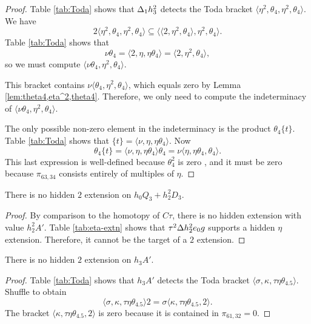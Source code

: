 \begin{proof}
Table \ref{tab:Toda} shows that $\Delta_1 h_3^2$ detects the
Toda bracket $\langle \eta^2, \theta_4, \eta^2, \theta_4 \rangle$.
We have
\[
2 \langle \eta^2, \theta_4, \eta^2, \theta_4 \rangle \subseteq
\langle \langle 2, \eta^2, \theta_4 \rangle, \eta^2, \theta_4 \rangle.
\]
Table \ref{tab:Toda} shows that
\[
\nu \theta_4 = \langle 2, \eta, \eta \theta_4 \rangle =
\langle 2, \eta^2, \theta_4 \rangle,
\]
so we must compute $\langle \nu \theta_4, \eta^2, \theta_4 \rangle$.

This bracket contains $\nu \langle \theta_4, \eta^2, \theta_4 \rangle$,
which equals zero by Lemma \ref{lem:theta4,eta^2,theta4}.
Therefore, we only need to compute the indeterminacy of 
$\langle \nu \theta_4, \eta^2, \theta_4 \rangle$.

The only possible non-zero element in the indeterminacy is the 
product $\theta_4 \{ t \}$.
Table \ref{tab:Toda} shows that 
$\{t \} = \langle \nu, \eta, \eta \theta_4 \rangle$.  Now
\[
\theta_4 \{ t\} = \langle \nu, \eta, \eta \theta_4 \rangle \theta_4 =
\nu \langle \eta, \eta \theta_4, \theta_4 \rangle.
\]
This last expression is well-defined because
$\theta_4^2$ is zero \cite{Xu16}, and it 
must be zero because 
$\pi_{63,34}$ consists entirely of multiples of $\eta$.
\end{proof}

\begin{lemma}
\label{lem:2-h0Q3}
There is no hidden $2$ extension on $h_0 Q_3 + h_2^2 D_3$.
\end{lemma}

\begin{proof}
By comparison to the homotopy of $C\tau$,
there is no hidden extension with value $h_2^2 A'$.
Table \ref{tab:eta-extn} shows that
$\tau^2 \Delta h_2^2 e_0 g$ supports a hidden $\eta$ extension.
Therefore, it cannot be the target of a $2$ extension.
\end{proof}

\begin{lemma}
\label{lem:2-h3A'}
There is no hidden $2$ extension on $h_3 A'$.
\end{lemma}

\begin{proof}
Table \ref{tab:Toda} shows that $h_3 A'$ detects the Toda bracket
$\langle \sigma, \kappa, \tau \eta \theta_{4.5} \rangle$.
Shuffle to obtain
\[
\langle \sigma, \kappa, \tau \eta \theta_{4.5} \rangle 2 =
\sigma \langle \kappa, \tau \eta \theta_{4.5}, 2 \rangle.
\]
The bracket $\langle \kappa, \tau \eta \theta_{4.5}, 2 \rangle$
is zero because it is contained in $\pi_{61,32} = 0$.
\end{proof}


